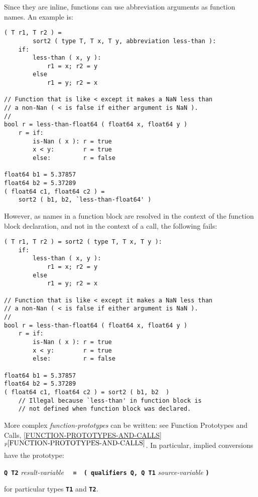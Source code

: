 \documentclass[12pt]{article}
\newcommand{\TT}[1]{{\tt \bfseries #1}}
\newcommand{\itemref}[1]{\ref{#1}$^{p\pageref{#1}}$}
\newenvironment{indpar}[1][0.3in]%
	{\begin{list}{}%
		     {\setlength{\itemsep}{0in}%
		      \setlength{\topsep}{0in}%
		      \setlength{\parsep}{1ex}%
		      \setlength{\labelwidth}{#1}%
		      \setlength{\leftmargin}{#1}%
		      \addtolength{\leftmargin}{\labelsep}}%
	 \item}%
	{\end{list}}
\begin{document}
Since they are inline, functions can use abbreviation arguments as function
names.  An example is:
\begin{indpar}\begin{verbatim}
( T r1, T r2 ) =
        sort2 ( type T, T x, T y, abbreviation less-than ):
    if:
        less-than ( x, y ):
            r1 = x; r2 = y
        else
            r1 = y; r2 = x

// Function that is like < except it makes a NaN less than
// a non-Nan ( < is false if either argument is NaN ).
//
bool r = less-than-float64 ( float64 x, float64 y )
    r = if:
        is-Nan ( x ): r = true
        x < y:        r = true
        else:         r = false

float64 b1 = 5.37857
float64 b2 = 5.37289
( float64 c1, float64 c2 ) =
    sort2 ( b1, b2, `less-than-float64' )
\end{verbatim}\end{indpar}

However, as names in a function block are resolved in the context
of the function block declaration, and not in the context of a
call, the following fails:
\begin{indpar}\begin{verbatim}
( T r1, T r2 ) = sort2 ( type T, T x, T y ):
    if:
        less-than ( x, y ):
            r1 = x; r2 = y
        else
            r1 = y; r2 = x

// Function that is like < except it makes a NaN less than
// a non-Nan ( < is false if either argument is NaN ).
//
bool r = less-than-float64 ( float64 x, float64 y )
    r = if:
        is-Nan ( x ): r = true
        x < y:        r = true
        else:         r = false

float64 b1 = 5.37857
float64 b2 = 5.37289
( float64 c1, float64 c2 ) = sort2 ( b1, b2  )
    // Illegal because `less-than' in function block is
    // not defined when function block was declared.
\end{verbatim}\end{indpar}

More complex {\em function-prototypes} can be written:
see Function Prototypes and Calls, \itemref{FUNCTION-PROTOTYPES-AND-CALLS}.
In particular, implied conversions have the prototype:
\begin{center}
\TT{Q T2} {\em result-variable}%
    ~~\TT{=}~~\TT{( qualifiers Q, Q T1} {\em source-variable} \TT{)}
\end{center}
for particular types \TT{T1} and \TT{T2}.
\end{document}
